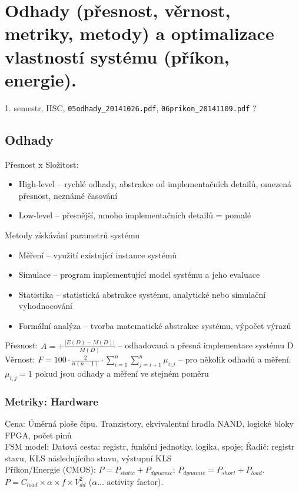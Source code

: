 \documentclass[a4paper, 11pt]{report}
\begin{document}
\chapter{Odhady (přesnost, věrnost, metriky, metody) a optimalizace vlastností systému (příkon, energie).} \label{cha:5}
1. semestr, HSC, \texttt{05odhady\_20141026.pdf}, \texttt{06prikon\_20141109.pdf} ?

\section{Odhady}
Přesnost x Složitost:
\begin{itemize}
	\item High-level -- rychlé odhady, abstrakce od implementačních detailů, omezená přesnost, neznámé časování
	\item Low-level -- přesnější, mnoho implementačních detailů = pomalé
\end{itemize}

Metody získávání parametrů systému
\begin{itemize}
	\item Měření -- využití existující instance systémů
	\item Simulace -- program implementující model systému a jeho evaluace
	\item Statistika -- statistická abstrakce systému, analytické nebo simulační vyhodnocování
	\item Formální analýza -- tvorba matematické abstrakce systému, výpočet výrazů
\end{itemize}

Přesnost: $A = + \frac{|E(D) - M(D)|}{M(D)}$ -- odhadovaná a přesná implementace systému D\\
Věrnost: $F = 100 \cdot \frac{2}{n(n-1)} \cdot \sum\limits_{i=1}^n \sum\limits_{j=i+1}^n \mu_{i,j}$ -- pro několik odhadů a měření. $\mu_{i,j} = 1$ pokud jsou odhady a měření ve stejném poměru

\subsection{Metriky: Hardware}
Cena: Úměrná ploše čipu. Tranzistory, ekvivalentní hradla NAND, logické bloky FPGA, počet pinů\\
FSM model: Datová cesta: registr, funkční jednotky, logika, spoje; Řadič: registr stavu, KLS následujícího stavu, výstupní KLS\\
Příkon/Energie (CMOS): $P = P_{static} + P_{dynamic}$; $P_{dynamic} = P_{short} + P_{load}$. $P = C_{load} \times \alpha \times f \times V_{dd}^2$ ($\alpha \dots$ activity factor).
\end{document}
